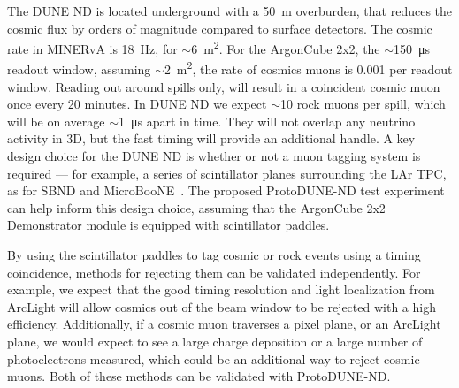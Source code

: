 The DUNE ND is located underground with a \SI{50}{\metre} overburden, that reduces the cosmic flux by orders of magnitude compared to surface detectors. The cosmic rate in MINERvA is \SI{18}{\hertz}, for $\sim$\SI{6}{\metre\squared}.  For the ArgonCube 2x2, the $\sim$\SI{150}{\micro\second} readout window, assuming $\sim$\SI{2}{\metre\squared}, the rate of cosmics muons is 0.001 per readout window. Reading out around spills only, will result in a coincident cosmic muon once every 20 minutes.
In DUNE ND we expect $\sim$10 rock muons per spill, which will be on average $\sim$\SI{1}{\micro\second} apart in time. They will not overlap any neutrino activity in 3D, but the fast timing will provide an additional handle.
A key design choice for the DUNE ND is whether or not a muon tagging system is required --- for example, a series of scintillator planes surrounding the LAr TPC, as for SBND and MicroBooNE~\cite{CRT}. The proposed ProtoDUNE-ND test experiment can help inform this design choice, assuming that the ArgonCube 2x2 Demonstrator module is equipped with scintillator paddles.

By using the scintillator paddles to tag cosmic or rock events using a timing coincidence, methods for rejecting them can be validated independently. For example, we expect that the good timing resolution and light localization from ArcLight will allow cosmics out of the beam window to be rejected with a high efficiency. Additionally, if a cosmic muon traverses a pixel plane, or an ArcLight plane, we would expect to see a large charge deposition or a large number of photoelectrons measured, which could be an additional way to reject cosmic muons. Both of these methods can be validated with ProtoDUNE-ND.

